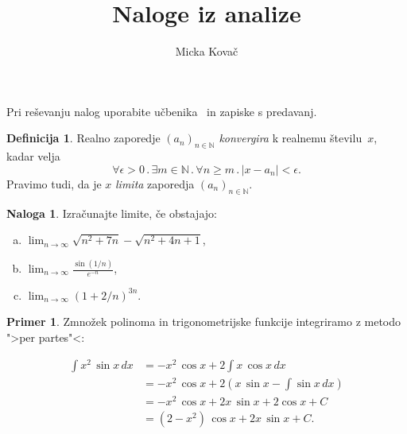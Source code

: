 \documentclass[11pt]{article}
\newcommand{\NN}{\mathbb{N}}
\theoremstyle{definition}
\newtheorem{definicija}{Definicija}
\theoremstyle{definition}
\newtheorem{naloga}{Naloga}
\theoremstyle{definition}
\newtheorem{primer}{Primer}
\begin{document}
\title{Naloge iz analize}
\author{Micka Kovač}
\date{}
\maketitle
Pri reševanju nalog uporabite učbenika~\cite{vidav08, rudin87} in zapiske s predavanj.

  
  \begin{definicija}
    Realno zaporedje $(a_n)_{n \in \NN}$ \emph{konvergira} k realnemu številu~$x$, kadar velja
    \[
      \forall  \epsilon  > 0 \,.\, \exists  m \in \NN \,.\, \forall n  \geq   m \,.\, |x - a_n| < \epsilon.
    \]
    Pravimo tudi, da je $x$ \emph{limita} zaporedja $(a_n)_{n \in \NN}$.
  \end{definicija}

  
  \begin{naloga}
    Izračunajte limite, če obstajajo:
    
    \begin{enumerate}[(a)]
      \item $\lim_{n \to \infty} \sqrt{n^2 + 7 n} - \sqrt{n^2 + 4 n + 1}$,
      \item $\lim_{n \to \infty} \frac{\sin (1/n)}{e^{-n}}$,
      \item $\lim_{n \to \infty} (1 + 2/n)^{3 n}$.
    \end{enumerate}
  \end{naloga}

  
  \begin{primer}
    Zmnožek polinoma in trigonometrijske funkcije integriramo z metodo ">per partes"<:
       
       \begin{align*}
        \int x^2 \, \sin x \, dx  &= - x^2 \, \cos x + 2 \int x \, \cos x \, dx \\
                                  &= - x^2 \, \cos x + 2 \left(x \, \sin x - \int \sin x \, dx \right) \\
                                  &= - x^2 \, \cos x + 2 x \, \sin x + 2 \cos x + C \\
                                  &= (2 - x^2) \, \cos x + 2 x \, \sin x + C.
       \end{align*}
  \end{primer}



\end{document}
